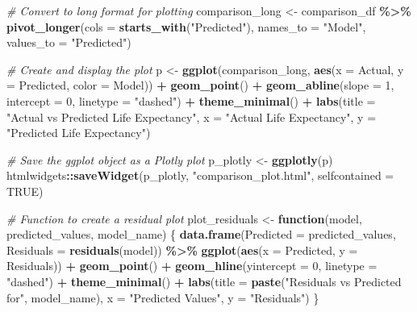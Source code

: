 \documentclass[
]{article}
\newenvironment{Shaded}{\begin{snugshade}}{\end{snugshade}}
\newcommand{\AttributeTok}[1]{\textcolor[rgb]{0.13,0.29,0.53}{#1}}
\newcommand{\CommentTok}[1]{\textcolor[rgb]{0.56,0.35,0.01}{\textit{#1}}}
\newcommand{\ConstantTok}[1]{\textcolor[rgb]{0.56,0.35,0.01}{#1}}
\newcommand{\ControlFlowTok}[1]{\textcolor[rgb]{0.13,0.29,0.53}{\textbf{#1}}}
\newcommand{\DecValTok}[1]{\textcolor[rgb]{0.00,0.00,0.81}{#1}}
\newcommand{\FunctionTok}[1]{\textcolor[rgb]{0.13,0.29,0.53}{\textbf{#1}}}
\newcommand{\NormalTok}[1]{#1}
\newcommand{\OtherTok}[1]{\textcolor[rgb]{0.56,0.35,0.01}{#1}}
\newcommand{\SpecialCharTok}[1]{\textcolor[rgb]{0.81,0.36,0.00}{\textbf{#1}}}
\newcommand{\StringTok}[1]{\textcolor[rgb]{0.31,0.60,0.02}{#1}}
\begin{document}
\begin{Shaded}
\begin{Highlighting}[]
\CommentTok{\# Convert to long format for plotting}
\NormalTok{comparison\_long }\OtherTok{\textless{}{-}}\NormalTok{ comparison\_df }\SpecialCharTok{\%\textgreater{}\%}
  \FunctionTok{pivot\_longer}\NormalTok{(}\AttributeTok{cols =} \FunctionTok{starts\_with}\NormalTok{(}\StringTok{"Predicted"}\NormalTok{), }\AttributeTok{names\_to =} \StringTok{"Model"}\NormalTok{, }\AttributeTok{values\_to =} \StringTok{"Predicted"}\NormalTok{)}

\CommentTok{\# Create and display the plot}
\NormalTok{p }\OtherTok{\textless{}{-}} \FunctionTok{ggplot}\NormalTok{(comparison\_long, }\FunctionTok{aes}\NormalTok{(}\AttributeTok{x =}\NormalTok{ Actual, }\AttributeTok{y =}\NormalTok{ Predicted, }\AttributeTok{color =}\NormalTok{ Model)) }\SpecialCharTok{+}
  \FunctionTok{geom\_point}\NormalTok{() }\SpecialCharTok{+}
  \FunctionTok{geom\_abline}\NormalTok{(}\AttributeTok{slope =} \DecValTok{1}\NormalTok{, }\AttributeTok{intercept =} \DecValTok{0}\NormalTok{, }\AttributeTok{linetype =} \StringTok{"dashed"}\NormalTok{) }\SpecialCharTok{+}
  \FunctionTok{theme\_minimal}\NormalTok{() }\SpecialCharTok{+}
  \FunctionTok{labs}\NormalTok{(}\AttributeTok{title =} \StringTok{"Actual vs Predicted Life Expectancy"}\NormalTok{,}
       \AttributeTok{x =} \StringTok{"Actual Life Expectancy"}\NormalTok{,}
       \AttributeTok{y =} \StringTok{"Predicted Life Expectancy"}\NormalTok{)}

\CommentTok{\# Save the ggplot object as a Plotly plot}
\NormalTok{p\_plotly }\OtherTok{\textless{}{-}} \FunctionTok{ggplotly}\NormalTok{(p)}
\NormalTok{htmlwidgets}\SpecialCharTok{::}\FunctionTok{saveWidget}\NormalTok{(p\_plotly, }\StringTok{"comparison\_plot.html"}\NormalTok{, }\AttributeTok{selfcontained =} \ConstantTok{TRUE}\NormalTok{)}



\CommentTok{\# Function to create a residual plot}
\NormalTok{plot\_residuals }\OtherTok{\textless{}{-}} \ControlFlowTok{function}\NormalTok{(model, predicted\_values, model\_name) \{}
  \FunctionTok{data.frame}\NormalTok{(}\AttributeTok{Predicted =}\NormalTok{ predicted\_values, }\AttributeTok{Residuals =} \FunctionTok{residuals}\NormalTok{(model)) }\SpecialCharTok{\%\textgreater{}\%}
    \FunctionTok{ggplot}\NormalTok{(}\FunctionTok{aes}\NormalTok{(}\AttributeTok{x =}\NormalTok{ Predicted, }\AttributeTok{y =}\NormalTok{ Residuals)) }\SpecialCharTok{+}
    \FunctionTok{geom\_point}\NormalTok{() }\SpecialCharTok{+}
    \FunctionTok{geom\_hline}\NormalTok{(}\AttributeTok{yintercept =} \DecValTok{0}\NormalTok{, }\AttributeTok{linetype =} \StringTok{"dashed"}\NormalTok{) }\SpecialCharTok{+}
    \FunctionTok{theme\_minimal}\NormalTok{() }\SpecialCharTok{+}
    \FunctionTok{labs}\NormalTok{(}\AttributeTok{title =} \FunctionTok{paste}\NormalTok{(}\StringTok{"Residuals vs Predicted for"}\NormalTok{, model\_name),}
         \AttributeTok{x =} \StringTok{"Predicted Values"}\NormalTok{, }\AttributeTok{y =} \StringTok{"Residuals"}\NormalTok{)}
\NormalTok{\}}


\end{Highlighting}
\end{Shaded}
\end{document}
